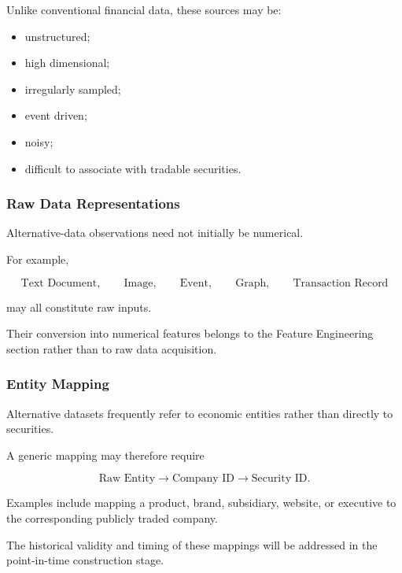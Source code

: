 \documentclass[11pt,a4paper]{article}
\begin{document}
Unlike conventional financial data, these sources may be:

\begin{itemize}
    \item unstructured;
    \item high dimensional;
    \item irregularly sampled;
    \item event driven;
    \item noisy;
    \item difficult to associate with tradable securities.
\end{itemize}


\subsubsection{Raw Data Representations}

Alternative-data observations need not initially be numerical.

For example,

\begin{equation}
\text{Text Document},
\qquad
\text{Image},
\qquad
\text{Event},
\qquad
\text{Graph},
\qquad
\text{Transaction Record}
\end{equation}

may all constitute raw inputs.

Their conversion into numerical features belongs to the Feature Engineering
section rather than to raw data acquisition.


\subsubsection{Entity Mapping}

Alternative datasets frequently refer to economic entities rather than directly
to securities.

A generic mapping may therefore require

\begin{equation}
\boxed{
\text{Raw Entity}
\longrightarrow
\text{Company ID}
\longrightarrow
\text{Security ID}.
}
\end{equation}

Examples include mapping a product, brand, subsidiary, website, or executive to
the corresponding publicly traded company.

The historical validity and timing of these mappings will be addressed in the
point-in-time construction stage.


\end{document}

